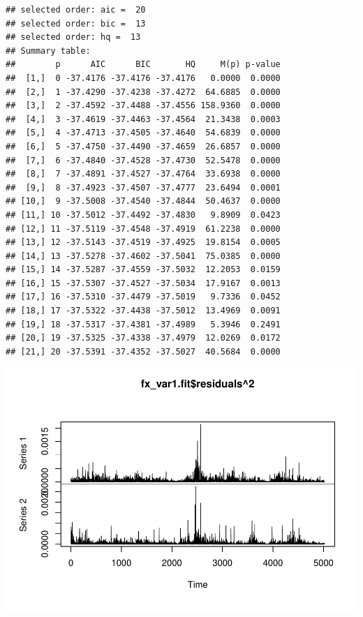 \documentclass[12pt,a4paper]{article}
\newenvironment{Shaded}{\begin{snugshade}}{\end{snugshade}}
\newcommand{\DataTypeTok}[1]{\textcolor[rgb]{0.13,0.29,0.53}{#1}}
\newcommand{\DecValTok}[1]{\textcolor[rgb]{0.00,0.00,0.81}{#1}}
\newcommand{\KeywordTok}[1]{\textcolor[rgb]{0.13,0.29,0.53}{\textbf{#1}}}
\newcommand{\NormalTok}[1]{#1}
\newcommand{\OperatorTok}[1]{\textcolor[rgb]{0.81,0.36,0.00}{\textbf{#1}}}
\begin{document}
\begin{Shaded}
\end{Shaded}

\begin{verbatim}
## selected order: aic =  20 
## selected order: bic =  13 
## selected order: hq =  13 
## Summary table:  
##        p      AIC      BIC       HQ     M(p) p-value
##  [1,]  0 -37.4176 -37.4176 -37.4176   0.0000  0.0000
##  [2,]  1 -37.4290 -37.4238 -37.4272  64.6885  0.0000
##  [3,]  2 -37.4592 -37.4488 -37.4556 158.9360  0.0000
##  [4,]  3 -37.4619 -37.4463 -37.4564  21.3438  0.0003
##  [5,]  4 -37.4713 -37.4505 -37.4640  54.6839  0.0000
##  [6,]  5 -37.4750 -37.4490 -37.4659  26.6857  0.0000
##  [7,]  6 -37.4840 -37.4528 -37.4730  52.5478  0.0000
##  [8,]  7 -37.4891 -37.4527 -37.4764  33.6938  0.0000
##  [9,]  8 -37.4923 -37.4507 -37.4777  23.6494  0.0001
## [10,]  9 -37.5008 -37.4540 -37.4844  50.4637  0.0000
## [11,] 10 -37.5012 -37.4492 -37.4830   9.8909  0.0423
## [12,] 11 -37.5119 -37.4548 -37.4919  61.2238  0.0000
## [13,] 12 -37.5143 -37.4519 -37.4925  19.8154  0.0005
## [14,] 13 -37.5278 -37.4602 -37.5041  75.0385  0.0000
## [15,] 14 -37.5287 -37.4559 -37.5032  12.2053  0.0159
## [16,] 15 -37.5307 -37.4527 -37.5034  17.9167  0.0013
## [17,] 16 -37.5310 -37.4479 -37.5019   9.7336  0.0452
## [18,] 17 -37.5322 -37.4438 -37.5012  13.4969  0.0091
## [19,] 18 -37.5317 -37.4381 -37.4989   5.3946  0.2491
## [20,] 19 -37.5325 -37.4338 -37.4979  12.0269  0.0172
## [21,] 20 -37.5391 -37.4352 -37.5027  40.5684  0.0000
\end{verbatim}

\begin{Shaded}
\end{Shaded}

\includegraphics{solution_exercise_5_files/figure-latex/unnamed-chunk-23-2.pdf}
\end{document}
